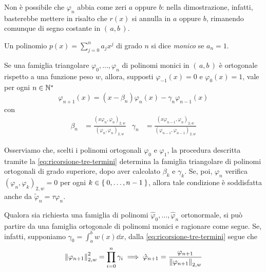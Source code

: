 	Non è possibile che \(\varphi_n\) abbia come zeri \(a\) oppure \(b\): nella dimostrazione, infatti, basterebbe mettere in risalto che \(r (x)\) si annulla in \(a\) oppure \(b\), rimanendo comunque di segno costante in \((\, a, b \,)\).
	
	\begin{definizione}
		Un polinomio \(p (x) = \sum_{j = 0}^n a_j x^j\) di grado \(n\) si dice \emph{monico} se \(a_n = 1\).
	\end{definizione}

	\begin{teorema}
		Se una famiglia triangolare \(\varphi_0, \dots, \varphi_n\) di polinomi monici in \((\, a, b \,)\) è ortogonale rispetto a una funzione peso \(w\), allora, supposti \(\varphi_{-1} (x) = 0\) e \(\varphi_0 (x) = 1\), vale per ogni \(n \in \mathbb{N}^*\)
		\begin{equation}\label{eq:ricorsione-tre-termini}
			\varphi_{n + 1} (x) = (x - \beta_n) \varphi_n (x) - \gamma_n \varphi_{n - 1} (x)
		\end{equation} 
		con
		\begin{align}
			\beta_n &= \frac{(x \varphi_n, \varphi_n)_{2, w}}{(\varphi_n, \varphi_n)_{2, w}} &
			\gamma_n &= \frac{(x \varphi_{n - 1}, \varphi_n)_{2, w}}{(\varphi_{n - 1}, \varphi_{n - 1})_{2, w}}
		\end{align}
	\end{teorema}

	Osserviamo che, scelti i polinomi ortogonali \(\varphi_0\) e \(\varphi_1\), la procedura descritta tramite la \eqref{eq:ricorsione-tre-termini} determina la famiglia triangolare di polinomi ortogonali di grado superiore, dopo aver calcolato \(\beta_k\) e \(\gamma_k\). Se, poi, \(\varphi_n\) verifica \((\varphi_n, \varphi_k)_{2, w} = 0\) per ogni \(k \in \Set{0, \dots, n - 1}\), allora tale condizione è soddisfatta anche da \(\tilde{\varphi}_n = \tau \varphi_n\).
	
	Qualora sia richiesta una famiglia di polinomi \(\hat{\varphi}_0, \dots, \hat{\varphi}_n\) ortonormale, si può partire da una famiglia ortogonale di polinomi monici e ragionare come segue. Se, infatti, supponiamo \(\gamma_0 = \int_a^b w (x) \dd{x}\), dalla \eqref{eq:ricorsione-tre-termini} segue che
	\begin{equation*}
		\norm{\varphi_{n + 1}}_{2, w}^2 = \prod_{i = 0}^n \gamma_i \implies \hat{\varphi}_{n + 1} = \frac{\varphi_{n + 1}}{\norm{\varphi_{n + 1}}_{2, w}}
	\end{equation*}